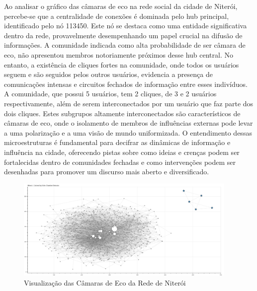 Ao analisar o gráfico das câmaras de eco na rede social da cidade de Niterói, percebe-se que a centralidade de conexões é dominada pelo hub principal, identificado pelo nó 113450. Este nó se destaca como uma entidade significativa dentro da rede, provavelmente desempenhando um papel crucial na difusão de informações. A comunidade indicada como alta probabilidade de ser câmara de eco, não apresentou membros notoriamente próximos desse hub central. No entanto, a existência de cliques fortes na comunidade, onde todos os usuários seguem e são seguidos pelos outros usuários, evidencia a presença de comunicações intensas e circuitos fechados de informação entre esses indivíduos. A comunidade, que possui 5 usuários, tem 2 cliques, de 3 e 2 usuários respectivamente, além de serem interconectados por um usuário que faz parte dos dois cliques. Estes subgrupos altamente interconectados são característicos de câmaras de eco, onde o isolamento de membros de influências externas pode levar a uma polarização e a uma visão de mundo uniformizada. O entendimento dessas microestruturas é fundamental para decifrar as dinâmicas de informação e influência na cidade, oferecendo pistas sobre como ideias e crenças podem ser fortalecidas dentro de comunidades fechadas e como intervenções podem ser desenhadas para promover um discurso mais aberto e diversificado.

\begin{figure}[htb]
	\centering
	\includegraphics[width=0.95\textwidth]{images/echo_chambers_niteroi.png}
	\caption{Visualização das Câmaras de Eco da Rede de Niterói}
	\label{fig:echo_chambers_niteroi}
\end{figure}

